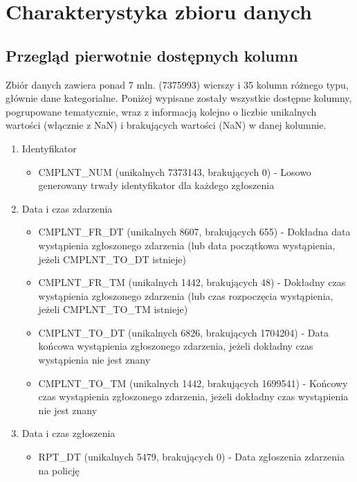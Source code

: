 \documentclass{classrep}
\begin{document}
    \section{Charakterystyka zbioru danych} {

        \subsection{Przegląd pierwotnie dostępnych kolumn} {
            Zbiór danych zawiera ponad 7 mln. (7375993) wierszy i 35 kolumn różnego typu, głównie dane kategorialne. Poniżej wypisane zostały wszystkie dostępne kolumny, pogrupowane tematycznie, wraz z informacją kolejno o liczbie unikalnych wartości (włącznie z NaN) i brakujących wartości (NaN) w danej kolumnie.
            \begin{enumerate}
                \item Identyfikator
                \begin{itemize}
                    \item CMPLNT\_NUM (unikalnych 7373143, brakujących 0) - Losowo generowany trwały identyfikator dla każdego zgłoszenia
                \end{itemize}
                \item Data i czas zdarzenia
                \begin{itemize}
                    \item CMPLNT\_FR\_DT (unikalnych 8607, brakujących 655) - Dokładna data wystąpienia zgłoszonego zdarzenia (lub data początkowa wystąpienia, jeżeli CMPLNT\_TO\_DT istnieje)
                    \item CMPLNT\_FR\_TM (unikalnych 1442, brakujących 48) - Dokładny czas wystąpienia zgłoszonego zdarzenia (lub czas rozpoczęcia wystąpienia, jeżeli CMPLNT\_TO\_TM istnieje)
                    \item CMPLNT\_TO\_DT (unikalnych 6826, brakujących 1704204) - Data końcowa wystąpienia zgłoszonego zdarzenia, jeżeli dokładny czas wystąpienia nie jest znany
                    \item CMPLNT\_TO\_TM (unikalnych 1442, brakujących 1699541) - Końcowy czas wystąpienia zgłoszonego zdarzenia, jeżeli dokładny czas wystąpienia nie jest znany
                \end{itemize}
                \item Data i czas zgłoszenia
                \begin{itemize}
                    \item RPT\_DT (unikalnych 5479, brakujących 0) - Data zgłoszenia zdarzenia na policję

\end{itemize}
\end{enumerate}}}
\end{document}

